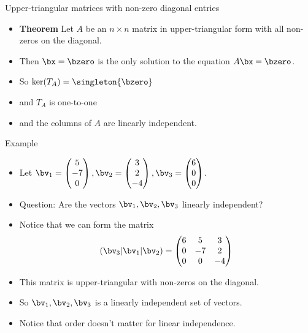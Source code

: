 \documentclass{beamer}
\begin{document}
\begin{frame}{Upper-triangular matrices with non-zero diagonal entries}

\begin{itemize}
\item \textbf{Theorem} Let $A$ be an $n\times n$ matrix in upper-triangular
form with all non-zeros on the diagonal.
\item Then $\bx=\bzero$ is the only solution to the equation $A\bx=\bzero$.
\item So $\ker(T_A) = \singleton{\bzero}$
\item and $T_A$ is one-to-one
\item and the columns of $A$ are linearly independent.
\end{itemize}

\end{frame}
\begin{frame}{Example}

\begin{itemize}
\item Let $\bv_1 =
\begin{pmatrix}
5 \\ -7 \\ 0
\end{pmatrix}
,
\bv_2 =
\begin{pmatrix}
3 \\ 2 \\ - 4
\end{pmatrix}
,
\bv_3 =
\begin{pmatrix}
6 \\ 0 \\ 0
\end{pmatrix}
$.
\item Question: Are the vectors $\bv_1,\bv_2,\bv_3$ linearly independent?
\item Notice that we can form the matrix
$$\left (\bv_3 \vert \bv_1 \vert \bv_2 \right) =
\begin{pmatrix}
6 &  5   &  3 \\
0 & -7   &  2 \\
0 &  0   & -4 \\
\end{pmatrix}
$$
\item This matrix is upper-triangular with non-zeros on the diagonal.
\item So $\bv_1,\bv_2,\bv_3$ is a linearly independent set of vectors.
\item Notice that order doesn't matter for linear independence.
\end{itemize}

\end{frame}
\end{document}
